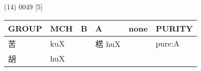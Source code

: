 \documentclass[14pt,a4paper]{scrartcl}
\begin{document}
(14) 0049 {[}5{]}

\begin{longtable}[c]{@{}llllll@{}}
\toprule
\begin{minipage}[b]{0.14\columnwidth}\raggedright\strut
GROUP
\strut\end{minipage} &
\begin{minipage}[b]{0.14\columnwidth}\raggedright\strut
MCH
\strut\end{minipage} &
\begin{minipage}[b]{0.14\columnwidth}\raggedright\strut
B
\strut\end{minipage} &
\begin{minipage}[b]{0.14\columnwidth}\raggedright\strut
A
\strut\end{minipage} &
\begin{minipage}[b]{0.14\columnwidth}\raggedright\strut
none
\strut\end{minipage} &
\begin{minipage}[b]{0.14\columnwidth}\raggedright\strut
PURITY
\strut\end{minipage}\tabularnewline
\midrule
\endhead
\begin{minipage}[t]{0.14\columnwidth}\raggedright\strut
苦
\strut\end{minipage} &
\begin{minipage}[t]{0.14\columnwidth}\raggedright\strut
kuX
\strut\end{minipage} &
\begin{minipage}[t]{0.14\columnwidth}\raggedright\strut
\strut\end{minipage} &
\begin{minipage}[t]{0.14\columnwidth}\raggedright\strut
楛 huX
\strut\end{minipage} &
\begin{minipage}[t]{0.14\columnwidth}\raggedright\strut
\strut\end{minipage} &
\begin{minipage}[t]{0.14\columnwidth}\raggedright\strut
pure:A
\strut\end{minipage}\tabularnewline
\begin{minipage}[t]{0.14\columnwidth}\raggedright\strut
胡
\strut\end{minipage} &
\begin{minipage}[t]{0.14\columnwidth}\raggedright\strut
huX
\strut\end{minipage} &
\begin{minipage}[t]{0.14\columnwidth}\raggedright\strut
\strut\end{minipage} &

\end{longtable}
\end{document}
